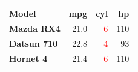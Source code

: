 \begin{table}
\centering
\begin{tabular}{>{\raggedright\arraybackslash}p{2.5cm}r>{}rr}
\toprule
Model & mpg & cyl & hp\\
\midrule
\textbf{Mazda RX4} & 21.0 & \textcolor{red}{6} & 110\\
\textbf{Datsun 710} & 22.8 & \textcolor{red}{4} & 93\\
\textbf{Hornet 4} & 21.4 & \textcolor{red}{6} & 110\\
\bottomrule
\end{tabular}
\end{table}
